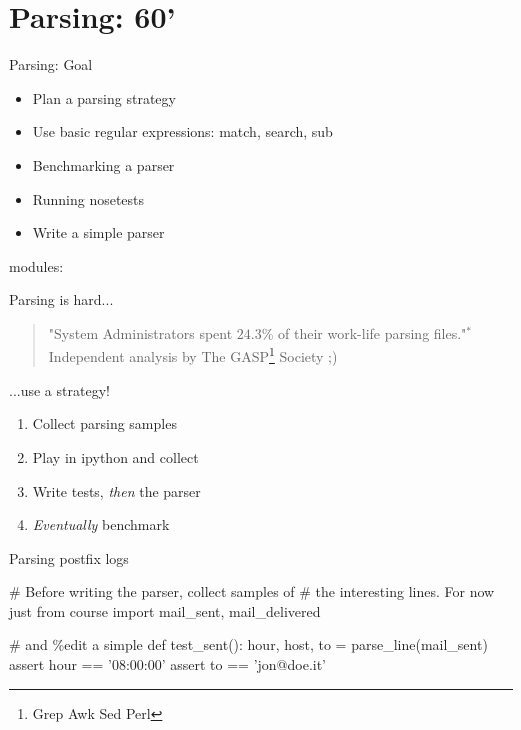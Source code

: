 \section{Parsing: 60'}

\begin{pyframe}{Parsing: Goal}
\begin{itemize}
\item Plan a parsing strategy
\item Use basic regular expressions: match, search, sub
\item Benchmarking a parser
\item Running nosetests
\item Write a simple parser
\end{itemize}
modules: 
\end{pyframe}


\begin{pyframe}{Parsing is hard...}
\begin{verse}
"System Administrators spent $24.3\%$ of
 their work-life parsing files."$^{*}$\\
\hfill *Independent analysis by The GASP\footnote{Grep Awk Sed Perl} Society ;)
\end{verse}
\end{pyframe}


\begin{pyframe}{...use a strategy!}
\begin{enumerate}
\Large
\item Collect parsing samples
\item Play in ipython and collect 
\item Write tests, \emph{then} the parser
\item \emph{Eventually} benchmark
\end{enumerate}
\end{pyframe}



\begin{pyframe}{Parsing postfix logs}
\begin{pycode}
# Before writing the parser, collect samples of
#  the interesting lines. For now just
from course import mail_sent, mail_delivered

# and \%edit a simple
def test_sent():
    hour, host, to = parse_line(mail_sent)
    assert hour == '08:00:00'
    assert to == 'jon@doe.it'

\end{pycode}
\end{pyframe}


